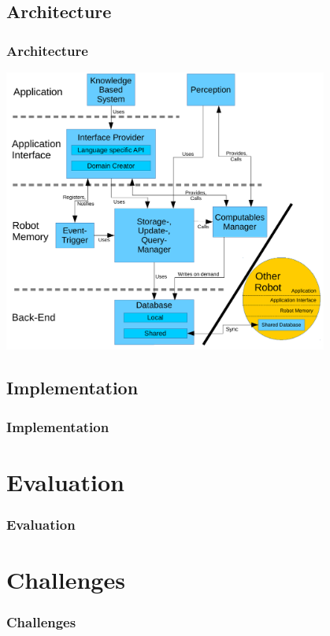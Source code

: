 \subsection{Architecture}
\begin{frame}
  \frametitle{Architecture}
  \center
  \includegraphics[width=0.8\textwidth]{../architecture.pdf}
\end{frame}

\subsection{Implementation}
\begin{frame}
  \frametitle{Implementation}
\end{frame}

\section{Evaluation}
\begin{frame}
  \frametitle{Evaluation}
\end{frame}

\section{Challenges}
\begin{frame}
  \frametitle{Challenges}
\end{frame}

